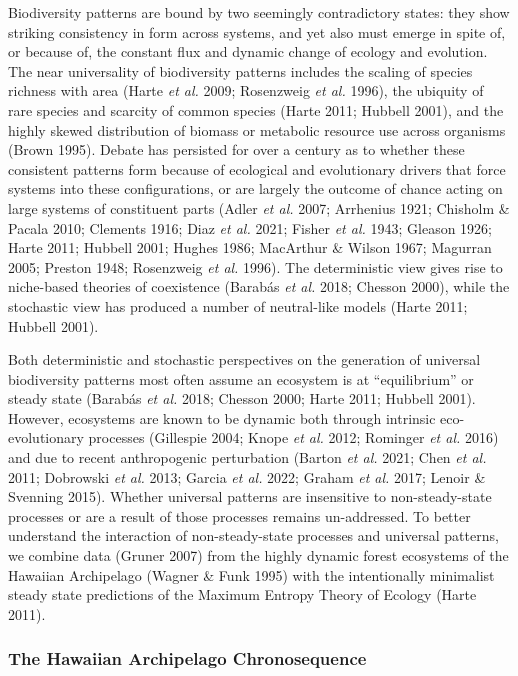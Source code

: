 \documentclass[
  letterpaper,
  DIV=11,
  numbers=noendperiod]{scrartcl}
\begin{document}
Biodiversity patterns are bound by two seemingly contradictory states:
they show striking consistency in form across systems, and yet also must
emerge in spite of, or because of, the constant flux and dynamic change
of ecology and evolution. The near universality of biodiversity patterns
includes the scaling of species richness with area (Harte \emph{et al.}
2009; Rosenzweig \emph{et al.} 1996), the ubiquity of rare species and
scarcity of common species (Harte 2011; Hubbell 2001), and the highly
skewed distribution of biomass or metabolic resource use across
organisms (Brown 1995). Debate has persisted for over a century as to
whether these consistent patterns form because of ecological and
evolutionary drivers that force systems into these configurations, or
are largely the outcome of chance acting on large systems of constituent
parts (Adler \emph{et al.} 2007; Arrhenius 1921; Chisholm \& Pacala
2010; Clements 1916; Diaz \emph{et al.} 2021; Fisher \emph{et al.} 1943;
Gleason 1926; Harte 2011; Hubbell 2001; Hughes 1986; MacArthur \& Wilson
1967; Magurran 2005; Preston 1948; Rosenzweig \emph{et al.} 1996). The
deterministic view gives rise to niche-based theories of coexistence
(Barabás \emph{et al.} 2018; Chesson 2000), while the stochastic view
has produced a number of neutral-like models (Harte 2011; Hubbell 2001).

Both deterministic and stochastic perspectives on the generation of
universal biodiversity patterns most often assume an ecosystem is at
``equilibrium'' or steady state (Barabás \emph{et al.} 2018; Chesson
2000; Harte 2011; Hubbell 2001). However, ecosystems are known to be
dynamic both through intrinsic eco-evolutionary processes (Gillespie
2004; Knope \emph{et al.} 2012; Rominger \emph{et al.} 2016) and due to
recent anthropogenic perturbation (Barton \emph{et al.} 2021; Chen
\emph{et al.} 2011; Dobrowski \emph{et al.} 2013; Garcia \emph{et al.}
2022; Graham \emph{et al.} 2017; Lenoir \& Svenning 2015). Whether
universal patterns are insensitive to non-steady-state processes or are
a result of those processes remains un-addressed. To better understand
the interaction of non-steady-state processes and universal patterns, we
combine data (Gruner 2007) from the highly dynamic forest ecosystems of
the Hawaiian Archipelago (Wagner \& Funk 1995) with the intentionally
minimalist steady state predictions of the Maximum Entropy Theory of
Ecology (Harte 2011).

\subsubsection{The Hawaiian Archipelago
Chronosequence}\label{the-hawaiian-archipelago-chronosequence}
\end{document}
